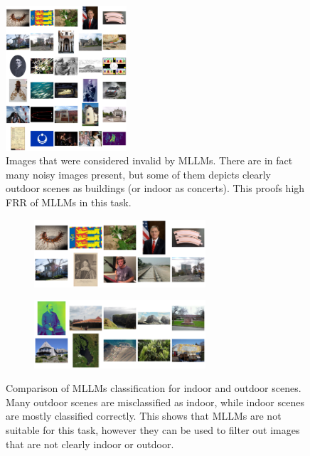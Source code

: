 \documentclass[a4paper]{article}
\begin{document}
\begin{figure}[H]
    \centering
    \includegraphics[width=0.4\textwidth]{images/invalid.png}
    \caption{Images that were considered invalid by MLLMs. There are in fact many noisy images present, but some of them depicts clearly outdoor scenes as buildings (or indoor as concerts). This proofs high FRR of MLLMs in this task.}
\end{figure}

\begin{figure}[H]
    \centering
    \begin{subfigure}[b]{\textwidth}
        \centering
        \includegraphics[width=0.7\textwidth]{images/mllm-indoor.png}
    \end{subfigure}

    \vspace{0.5cm}

    \begin{subfigure}[b]{\textwidth}
        \centering
        \includegraphics[width=0.7\textwidth]{images/mllm-outdoor.png}
    \end{subfigure}
    \caption{Comparison of MLLMs classification for indoor and outdoor scenes. Many outdoor scenes are misclassified as indoor, while indoor scenes are mostly classified correctly. This shows that MLLMs are not suitable for this task, however they can be used to filter out images that are not clearly indoor or outdoor.}
\end{figure}
\end{document}
